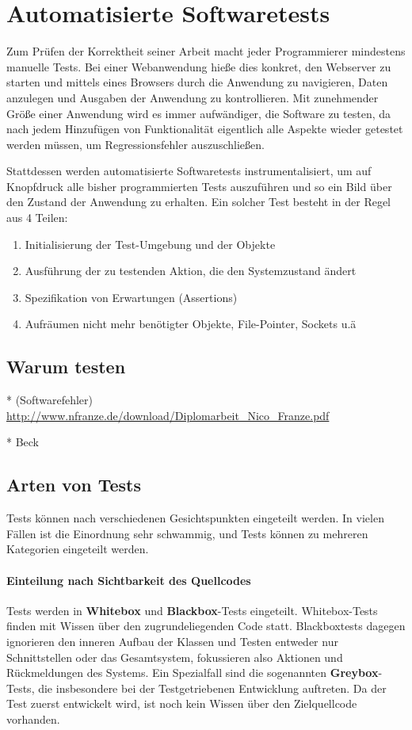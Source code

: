 \section{Automatisierte Softwaretests}

Zum Prüfen der Korrektheit seiner Arbeit macht jeder Programmierer mindestens manuelle Tests. Bei einer Webanwendung hieße dies konkret, den Webserver zu starten und mittels eines Browsers durch die Anwendung zu navigieren, Daten anzulegen und Ausgaben der Anwendung zu kontrollieren. Mit zunehmender Größe einer Anwendung wird es immer aufwändiger, die Software zu testen, da nach jedem Hinzufügen von Funktionalität eigentlich alle Aspekte wieder getestet werden müssen, um Regressionsfehler auszuschließen.

Stattdessen werden automatisierte Softwaretests instrumentalisiert, um auf Knopfdruck alle bisher programmierten Tests auszuführen und so ein Bild über den Zustand der Anwendung zu erhalten.
Ein solcher Test besteht in der Regel aus 4 Teilen:
\begin{enumerate}
 \item Initialisierung der Test-Umgebung und der Objekte
 \item Ausführung der zu testenden Aktion, die den Systemzustand ändert
 \item Spezifikation von Erwartungen (Assertions)
 \item Aufräumen nicht mehr benötigter Objekte, File-Pointer, Sockets u.ä 
\end{enumerate}



\subsection{Warum testen}

* (Softwarefehler) \url{http://www.nfranze.de/download/Diplomarbeit_Nico_Franze.pdf}

* Beck

\subsection{Arten von Tests}
Tests können nach verschiedenen Gesichtspunkten eingeteilt werden. In vielen Fällen ist die Einordnung sehr schwammig, und Tests können zu mehreren Kategorien eingeteilt werden.
\paragraph{Einteilung nach Sichtbarkeit des Quellcodes} Tests werden in \textbf{Whitebox} und \textbf{Blackbox}-Tests eingeteilt. Whitebox-Tests finden mit Wissen über den zugrundeliegenden Code statt. Blackboxtests dagegen ignorieren den inneren Aufbau der Klassen und Testen entweder nur Schnittstellen oder das Gesamtsystem, fokussieren also Aktionen und Rückmeldungen des Systems.
Ein Spezialfall sind die sogenannten \textbf{Greybox}-Tests, die insbesondere bei der Testgetriebenen Entwicklung auftreten. Da der Test zuerst entwickelt wird, ist noch kein Wissen über den Zielquellcode vorhanden.

